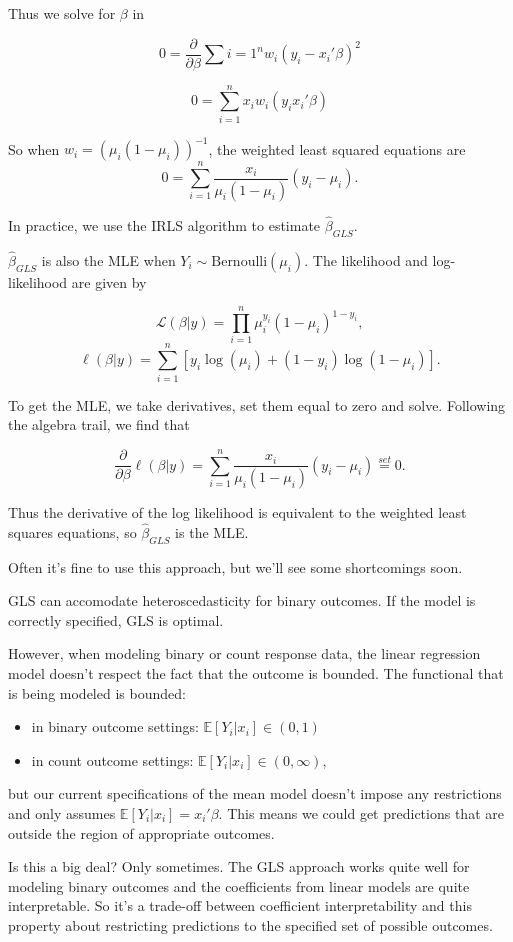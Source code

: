 \documentclass[
  letterpaper,
  DIV=11,
  numbers=noendperiod]{scrreport}
\providecommand{\tightlist}{%
  \setlength{\itemsep}{0pt}\setlength{\parskip}{0pt}}\usepackage{longtable,booktabs,array}
\begin{document}
Thus we solve for \(\beta\) in

\[ 0 = \frac{\partial}{\partial \beta } \sum{i=1}^n w_i (y_i - x_i' \beta)^2\]

\[ 0 = \sum_{i=1}^n x_i w_i (y_i x_i' \beta)\]

So when \(w_i = (\mu_i (1- \mu_i))^{-1}\), the weighted least squared
equations are
\[0 = \sum_{i=1}^n \frac{x_i}{\mu_i ( 1- \mu_i)} (y_i - \mu_i).\]

In practice, we use the IRLS algorithm to estimate \(\hat \beta_{GLS}\).

\(\hat \beta_{GLS}\) is also the MLE when
\(Y_i \sim \text{Bernoulli}(\mu_i)\). The likelihood and log-likelihood
are given by

\[\mathcal L(\beta | y) = \prod_{i=1}^n \mu_i^{y_i} (1-\mu_i)^{1-y_i},\]
\[\ell(\beta | y) = \sum_{i=1}^n [y_i \log (\mu_i) + (1-y_i) \log (1-\mu_i)].\]

To get the MLE, we take derivatives, set them equal to zero and solve.
Following the algebra trail, we find that

\[\frac{\partial}{\partial \beta} \ell (\beta | y ) = \sum_{i=1}^n \frac{x_i}{\mu_i (1-\mu_i)} (y_i - \mu_i) \stackrel{set}{=} 0.\]

Thus the derivative of the log likelihood is equivalent to the weighted
least squares equations, so \(\hat \beta_{GLS}\) is the MLE.

Often it's fine to use this approach, but we'll see some shortcomings
soon.

GLS can accomodate heteroscedasticity for binary outcomes. If the model
is correctly specified, GLS is optimal.

However, when modeling binary or count response data, the linear
regression model doesn't respect the fact that the outcome is bounded.
The functional that is being modeled is bounded:

\begin{itemize}
\tightlist
\item
  in binary outcome settings: \(\mathbb E[Y_i | x_i] \in (0,1)\)
\item
  in count outcome settings: \(\mathbb E[Y_i | x_i] \in (0,\infty)\),
\end{itemize}

but our current specifications of the mean model doesn't impose any
restrictions and only assumes \(\mathbb E[Y_i|x_i] = x_i' \beta\). This
means we could get predictions that are outside the region of
appropriate outcomes.

Is this a big deal? Only sometimes. The GLS approach works quite well
for modeling binary outcomes and the coefficients from linear models are
quite interpretable. So it's a trade-off between coefficient
interpretability and this property about restricting predictions to the
specified set of possible outcomes.
\end{document}
